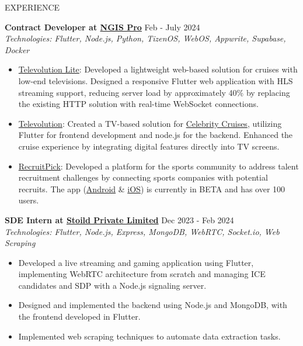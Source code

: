 \documentclass{resume} %
\begin{document}
\begin{rSection}{EXPERIENCE}

    \textbf{Contract Developer at \href{https://ngispro.com/}{NGIS Pro}} \hfill Feb - July 2024\\
    \textit{Technologies: Flutter, Node.js, Python, TizenOS, WebOS, Appwrite, Supabase, Docker}
    \begin{itemize}
        \itemsep -3pt {}
        \item \href{https://mytvpocroyal.com/lite/}{Televolution Lite}: Developed a lightweight web-based solution for cruises with low-end televisions. Designed a responsive Flutter web application with HLS streaming support, reducing server load by approximately 40\% by replacing the existing HTTP solution with real-time WebSocket connections.
        \item \href{https://mytvpocroyal.com/web2}{Televolution}: Created a TV-based solution for \href{https://www.celebritycruises.com}{Celebrity Cruises}, utilizing Flutter for frontend development and node.js for the backend. Enhanced the cruise experience by integrating digital features directly into TV screens.
        \item \href{https://recruitpick.com}{RecruitPick}: Developed a platform for the sports community to address talent recruitment challenges by connecting sports companies with potential recruits. The app (\href{https://play.google.com/store/apps/details?id=com.recruitpick.app.prod}{Android} \& \href{https://apps.apple.com/in/app/recruit-pick-inc/id6478814537}{iOS}) is currently in BETA and has over 100 users.
    \end{itemize}

    \textbf{SDE Intern at \href{https://stoild.in/}{Stoild Private Limited}} \hfill Dec 2023 - Feb 2024\\
    \textit{Technologies: Flutter, Node.js, Express, MongoDB, WebRTC, Socket.io, Web Scraping}
    \begin{itemize}
        \itemsep -3pt {}
        \item Developed a live streaming and gaming application using Flutter, implementing WebRTC architecture from scratch and managing ICE candidates and SDP with a Node.js signaling server.
        \item Designed and implemented the backend using Node.js and MongoDB, with the frontend developed in Flutter.
        \item Implemented web scraping techniques to automate data extraction tasks.
    \end{itemize}


\end{rSection}
\end{document}
